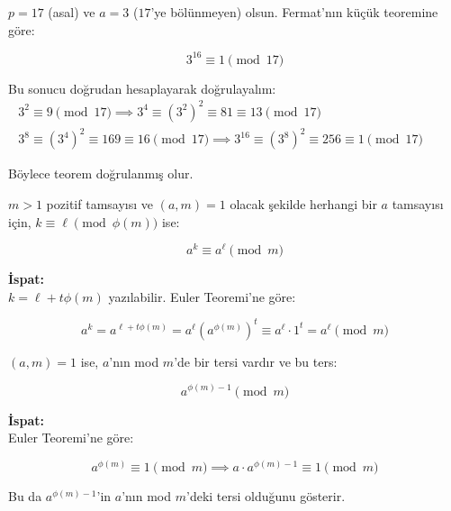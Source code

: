\vspace{2em}

\begin{tcolorbox}[colback=red!5, colframe=red!50!black, title=\textbf{Örnek 1.26: Fermat'nın Küçük Teoremi Uygulaması}, fonttitle=\bfseries, sharp corners]
$p = 17$ (asal) ve $a = 3$ ($17$'ye bölünmeyen) olsun. Fermat'nın küçük teoremine göre:

\[
3^{16} \equiv 1 \pmod{17}
\]

Bu sonucu doğrudan hesaplayarak doğrulayalım:
\begin{eqnarray*}
3^2 \equiv 9 \pmod{17} \implies 3^4 \equiv (3^2)^2 \equiv 81 \equiv 13 \pmod{17}
&&\text{ } \\
3^8 \equiv (3^4)^2 \equiv 169 \equiv 16 \pmod{17} \implies 3^{16} \equiv (3^8)^2 \equiv 256 \equiv 1 \pmod{17}
\end{eqnarray*}

Böylece teorem doğrulanmış olur.
\end{tcolorbox}

\vspace{2em}

\begin{tcolorbox}[colback=green!5, colframe=green!50!black, title=\textbf{Sonuç 1.27: Euler-Fermat Genellemesi}, fonttitle=\bfseries, sharp corners]
$m > 1$ pozitif tamsayısı ve $(a,m) = 1$ olacak şekilde herhangi bir $a$ tamsayısı için, $k \equiv \ell \pmod{\phi(m)}$ ise:

\[
a^k \equiv a^\ell \pmod{m}
\]

\textbf{İspat:} \\
$k = \ell + t\phi(m)$ yazılabilir. Euler Teoremi'ne göre:

\[
a^k = a^{\ell + t\phi(m)} = a^\ell (a^{\phi(m)})^t \equiv a^\ell \cdot 1^t = a^\ell \pmod{m}
\]
\end{tcolorbox}

\vspace{2em}

\begin{tcolorbox}[colback=purple!5, colframe=purple!50!black, title=\textbf{Teorem 1.16: Modüler Tersin Varlığı}, fonttitle=\bfseries, sharp corners]
$(a,m) = 1$ ise, $a$'nın mod $m$'de bir tersi vardır ve bu ters:

\[
a^{\phi(m)-1} \pmod{m}
\]

\textbf{İspat:} \\
Euler Teoremi'ne göre:

\[
a^{\phi(m)} \equiv 1 \pmod{m} \implies a \cdot a^{\phi(m)-1} \equiv 1 \pmod{m}
\]

Bu da $a^{\phi(m)-1}$'in $a$'nın mod $m$'deki tersi olduğunu gösterir.
\end{tcolorbox}

